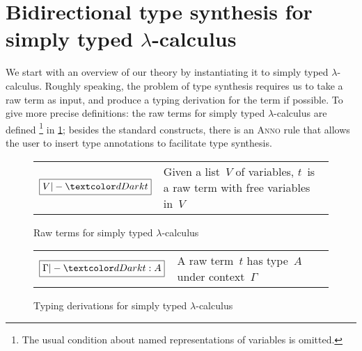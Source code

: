 
\section{Bidirectional type synthesis for simply typed \texorpdfstring{$\lambda$}{λ}-calculus} \label{sec:key-ideas}


We start with an overview of our theory by instantiating it to simply typed $\lambda$-calculus.
Roughly speaking, the problem of type synthesis requires us to take a raw term as input, and produce a typing derivation for the term if possible.
To give more precise definitions: the raw terms for simply typed $\lambda$-calculus are defined%
\footnote{The usual condition about named representations of variables is omitted.}
in \cref{fig:STLC-raw-terms};
besides the standard constructs, there is an \textsc{Anno} rule that allows the user to insert type annotations to facilitate type synthesis.

\begin{figure}
  \small
  \bgroup
  \renewcommand{\arraystretch}{1.5}
  \begin{tabular}{ r l }
    $\boxed{V |- \isTerm{t}}$ & Given a list~$V$ of variables, $t$~is a raw term with free variables in~$V$
  \end{tabular}
  \egroup
  \centering
  \caption{Raw terms for simply typed $\lambda$-calculus}
  \label{fig:STLC-raw-terms}
\end{figure}

\begin{figure}
  \small
  \bgroup
  \renewcommand{\arraystretch}{1.5}
  \begin{tabular}{ r l }
    $\boxed{\Gamma |- \isTerm{t} : A}$ & A raw term~$t$ has type~$A$ under context~$\Gamma$
  \end{tabular}
  \egroup
  \centering
  \caption{Typing derivations for simply typed $\lambda$-calculus}
  \label{fig:STLC-typing-derivations}
\end{figure}

